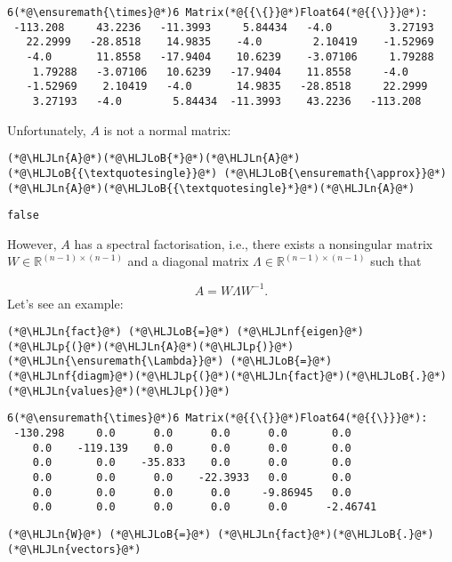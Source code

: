 \documentclass[12pt,landscape]{article}
\newcommand{\HLJLn}[1]{#1}
\newcommand{\HLJLnf}[1]{\textcolor[RGB]{66,102,213}{#1}}
\newcommand{\HLJLoB}[1]{\textcolor[RGB]{102,102,102}{\textbf{#1}}}
\newcommand{\HLJLp}[1]{#1}
\begin{document}
{\begin{lstlisting}
6(*@\ensuremath{\times}@*)6 Matrix(*@{{\{}}@*)Float64(*@{{\}}}@*):
 -113.208     43.2236   -11.3993     5.84434   -4.0         3.27193
   22.2999   -28.8518    14.9835    -4.0        2.10419    -1.52969
   -4.0       11.8558   -17.9404    10.6239    -3.07106     1.79288
    1.79288   -3.07106   10.6239   -17.9404    11.8558     -4.0
   -1.52969    2.10419   -4.0       14.9835   -28.8518     22.2999
    3.27193   -4.0        5.84434  -11.3993    43.2236   -113.208
\end{lstlisting}


Unfortunately, $A$ is not a normal matrix:


\begin{lstlisting}
(*@\HLJLn{A}@*)(*@\HLJLoB{*}@*)(*@\HLJLn{A}@*)(*@\HLJLoB{{\textquotesingle}}@*) (*@\HLJLoB{\ensuremath{\approx}}@*) (*@\HLJLn{A}@*)(*@\HLJLoB{{\textquotesingle}*}@*)(*@\HLJLn{A}@*)
\end{lstlisting}

\begin{lstlisting}
false
\end{lstlisting}


However, $A$ has a spectral factorisation, i.e., there exists a nonsingular matrix $W \in \mathbb{R}^{(n-1)\times (n-1)}$ and a diagonal matrix $\Lambda \in \mathbb{R}^{(n-1)\times (n-1)}$ such that

\[
A = W\Lambda W^{-1}.
\]
Let's see an example:


\begin{lstlisting}
(*@\HLJLn{fact}@*) (*@\HLJLoB{=}@*) (*@\HLJLnf{eigen}@*)(*@\HLJLp{(}@*)(*@\HLJLn{A}@*)(*@\HLJLp{)}@*)
(*@\HLJLn{\ensuremath{\Lambda}}@*) (*@\HLJLoB{=}@*) (*@\HLJLnf{diagm}@*)(*@\HLJLp{(}@*)(*@\HLJLn{fact}@*)(*@\HLJLoB{.}@*)(*@\HLJLn{values}@*)(*@\HLJLp{)}@*)
\end{lstlisting}

\begin{lstlisting}
6(*@\ensuremath{\times}@*)6 Matrix(*@{{\{}}@*)Float64(*@{{\}}}@*):
 -130.298     0.0      0.0      0.0      0.0       0.0
    0.0    -119.139    0.0      0.0      0.0       0.0
    0.0       0.0    -35.833    0.0      0.0       0.0
    0.0       0.0      0.0    -22.3933   0.0       0.0
    0.0       0.0      0.0      0.0     -9.86945   0.0
    0.0       0.0      0.0      0.0      0.0      -2.46741
\end{lstlisting}


\begin{lstlisting}
(*@\HLJLn{W}@*) (*@\HLJLoB{=}@*) (*@\HLJLn{fact}@*)(*@\HLJLoB{.}@*)(*@\HLJLn{vectors}@*)
\end{lstlisting}

}
\end{document}

